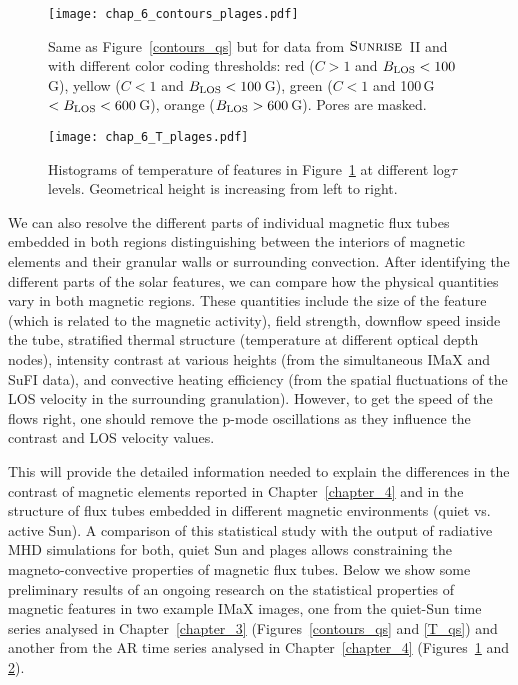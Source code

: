 \documentclass[goettingen, gauss, print]{thesis}
\begin{document}
\begin{figure}[h!]
\centering
\texttt{[image: chap\_6\_contours\_plages.pdf]}
\caption{Same as Figure~\ref{contours_qs} but for data from $\textsc{Sunrise}$~II and with different color coding thresholds: red ($C>1$ and $B_{\rm LOS}<100$\,G), yellow ($C<1$ and $B_{\rm LOS}<100$\,G), green ($C<1$ and 100\,G$<B_{\rm LOS}<600$\,G), orange ($B_{\rm LOS} >600$\,G). Pores are masked. }
\label{contours_plages}

\end{figure}

\begin{figure}
\centering
\hspace*{-2cm}\texttt{[image: chap\_6\_T\_plages.pdf]}
\caption{Histograms of temperature of features in Figure~\ref{contours_plages}  at different log$\tau$ levels. Geometrical height is increasing from left to right.}
\label{T_plages}
\end{figure}

We can also resolve the different parts of individual magnetic flux tubes embedded in both regions distinguishing between the interiors of magnetic elements and their granular walls or surrounding convection. After identifying the different parts of the solar features,  we can compare how the physical quantities vary in both magnetic regions. These quantities include the size of the feature (which is related to the magnetic activity), field strength, downflow speed inside the tube, stratified thermal structure (temperature at different optical depth nodes), intensity contrast at various heights (from the simultaneous IMaX and SuFI data), and convective heating efficiency (from the spatial fluctuations of the LOS velocity in the surrounding granulation). However, to get the speed of the flows right, one should remove the p-mode oscillations as they influence the contrast and LOS velocity values.

This will provide the detailed information needed to explain the differences in the contrast of magnetic elements reported in Chapter~\ref{chapter_4} and in the structure of flux tubes embedded in different magnetic environments (quiet vs. active Sun). A comparison of this statistical study with the output of radiative MHD simulations for both, quiet Sun and plages allows constraining the magneto-convective properties of magnetic flux tubes. Below we show some preliminary results of an ongoing research on the statistical properties of magnetic features in two example IMaX images, one from the quiet-Sun time series analysed in Chapter~\ref{chapter_3} (Figures~\ref{contours_qs} and \ref{T_qs}) and another from the AR time series analysed in Chapter~\ref{chapter_4} (Figures~\ref{contours_plages} and \ref{T_plages}). 
 
\end{document}
